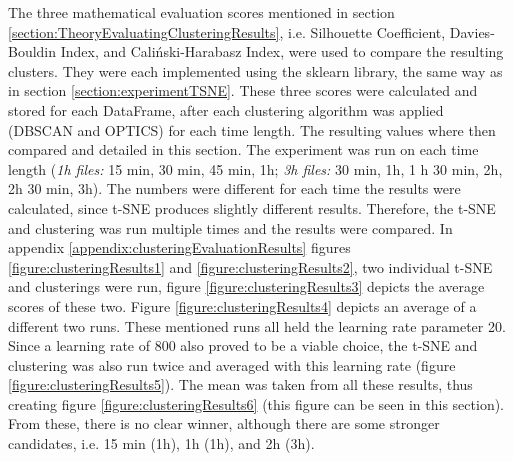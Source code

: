 
The three mathematical evaluation scores mentioned in section \ref{section:TheoryEvaluatingClusteringResults}, i.e. Silhouette Coefficient, Davies-Bouldin Index, and Caliński-Harabasz Index, were used to compare the resulting clusters.  They were each implemented using the sklearn library, the same way as in section \ref{section:experimentTSNE}. These three scores were calculated and stored for each DataFrame, after each clustering algorithm was applied (DBSCAN and OPTICS) for each time length. The resulting values where then compared and detailed in this section.
The experiment was run on each time length (\textit{1h files:} 15 min, 30 min, 45 min, 1h; \textit{3h files:} 30 min, 1h, 1 h 30 min, 2h, 2h 30 min, 3h).
The numbers were different for each time the results were calculated, since t-SNE produces slightly different results. Therefore, the t-SNE and clustering was run multiple times and the results were compared. In appendix \ref{appendix:clusteringEvaluationResults} figures \ref{figure:clusteringResults1} and \ref{figure:clusteringResults2}, two individual t-SNE and clusterings were run, figure \ref{figure:clusteringResults3} depicts the average scores of these two. Figure \ref{figure:clusteringResults4} depicts an average of a different two runs. These mentioned runs all held the learning rate parameter 20. Since a learning rate of 800 also proved to be a viable choice, the t-SNE and clustering was also run twice and averaged with this learning rate (figure \ref{figure:clusteringResults5}). The mean was taken from all these results, thus creating figure \ref{figure:clusteringResults6} (this figure can be seen in this section). From these, there is no clear winner, although there are some stronger candidates, i.e. 15 min (1h), 1h (1h), and 2h (3h). 

